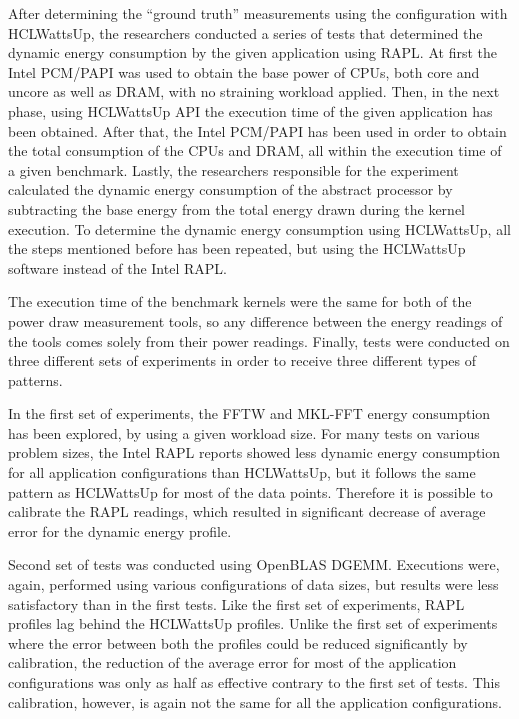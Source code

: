 After determining the “ground truth” measurements using the
configuration with HCLWattsUp, the researchers conducted a series
of tests that determined the dynamic energy consumption by the
given application using RAPL. At first the Intel PCM/PAPI was
used to obtain the base power of CPUs, both core and uncore as
well as DRAM, with no straining workload applied. Then, in the
next phase, using HCLWattsUp API the execution time of the given
application has been obtained. After that, the Intel PCM/PAPI has
been used in order to obtain the total consumption of the CPUs and
DRAM, all within the execution time of a given benchmark. Lastly,
the researchers responsible for the experiment calculated the
dynamic energy consumption of the abstract processor by subtracting
the base energy from the total energy drawn during the kernel
execution. To determine the dynamic energy consumption using
HCLWattsUp, all the steps mentioned before has been repeated,
but using the HCLWattsUp software instead of the Intel RAPL.

The execution time of the benchmark kernels were the same for
both of the power draw measurement tools, so any difference
between the energy readings of the tools comes solely from
their power readings. Finally, tests were conducted on three
different sets of experiments in order to receive three different
types of patterns.

In the first set of experiments, the FFTW and MKL-FFT energy
consumption has been explored, by using a given workload size.
For many tests on various problem sizes, the Intel RAPL reports
showed less dynamic energy consumption for all application
configurations than HCLWattsUp, but it follows the same pattern
as HCLWattsUp for most of the data points. Therefore it is
possible to calibrate the RAPL readings, which resulted in
significant decrease of average error for the dynamic energy
profile.

Second set of tests was conducted using OpenBLAS DGEMM.
Executions were, again, performed using various configurations
of data sizes, but results were less satisfactory than in the
first tests. Like the first set of experiments, RAPL profiles
lag behind the HCLWattsUp profiles. Unlike the first set of
experiments where the error between both the profiles could be
reduced significantly by calibration, the reduction of the average
error for most of the application configurations was only as
half as effective contrary to the first set of tests. This
calibration, however, is again not the same for all the application
configurations.

